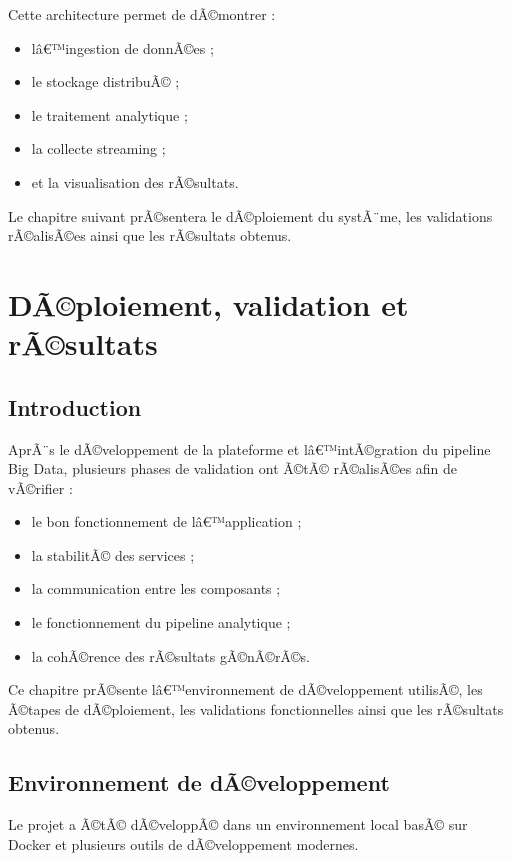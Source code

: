 ﻿\documentclass[12pt,a4paper]{report}
\begin{document}
Cette architecture permet de dÃ©montrer :
\begin{itemize}
    \item lâ€™ingestion de donnÃ©es ;
    \item le stockage distribuÃ© ;
    \item le traitement analytique ;
    \item la collecte streaming ;
    \item et la visualisation des rÃ©sultats.
\end{itemize}

Le chapitre suivant prÃ©sentera le dÃ©ploiement du systÃ¨me, les validations rÃ©alisÃ©es ainsi que les rÃ©sultats obtenus.
\chapter{DÃ©ploiement, validation et rÃ©sultats}

\section{Introduction}

AprÃ¨s le dÃ©veloppement de la plateforme et lâ€™intÃ©gration du pipeline Big Data, plusieurs phases de validation ont Ã©tÃ© rÃ©alisÃ©es afin de vÃ©rifier :
\begin{itemize}
    \item le bon fonctionnement de lâ€™application ;
    \item la stabilitÃ© des services ;
    \item la communication entre les composants ;
    \item le fonctionnement du pipeline analytique ;
    \item la cohÃ©rence des rÃ©sultats gÃ©nÃ©rÃ©s.
\end{itemize}

Ce chapitre prÃ©sente lâ€™environnement de dÃ©veloppement utilisÃ©, les Ã©tapes de dÃ©ploiement, les validations fonctionnelles ainsi que les rÃ©sultats obtenus.

\section{Environnement de dÃ©veloppement}

Le projet a Ã©tÃ© dÃ©veloppÃ© dans un environnement local basÃ© sur Docker et plusieurs outils de dÃ©veloppement modernes.
\end{document}
